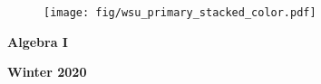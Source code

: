 \vfill
  \begin{figure}[!htbp]
    \centering
    \texttt{[image: fig/wsu\_primary\_stacked\_color.pdf]}
  \end{figure}
  \centerline{\bf Algebra I}
  \centerline{\bf Winter 2020}
\vfill
\thispagestyle{empty}